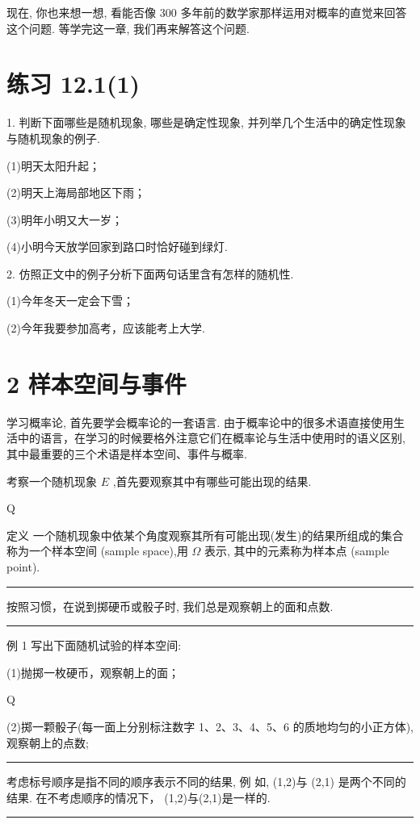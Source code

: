 \documentclass[10pt]{article}
\newcommand{\HRule}{\begin{center}\rule{0.9\linewidth}{0.2mm}\end{center}}
\begin{document}
现在, 你也来想一想, 看能否像 300 多年前的数学家那样运用对概率的直觉来回答这个问题. 等学完这一章, 我们再来解答这个问题.

\section*{练习 12.1(1)}

1. 判断下面哪些是随机现象, 哪些是确定性现象, 并列举几个生活中的确定性现象与随机现象的例子.

(1)明天太阳升起；

(2)明天上海局部地区下雨；

(3)明年小明又大一岁；

(4)小明今天放学回家到路口时恰好碰到绿灯.

2. 仿照正文中的例子分析下面两句话里含有怎样的随机性.

(1)今年冬天一定会下雪；

(2)今年我要参加高考，应该能考上大学.

\section*{2 样本空间与事件}

学习概率论, 首先要学会概率论的一套语言. 由于概率论中的很多术语直接使用生活中的语言，在学习的时候要格外注意它们在概率论与生活中使用时的语义区别, 其中最重要的三个术语是样本空间、事件与概率.

考察一个随机现象 \(E\) ,首先要观察其中有哪些可能出现的结果.

Q

定义 一个随机现象中依某个角度观察其所有可能出现(发生)的结果所组成的集合称为一个样本空间 (sample space),用 \(\Omega\) 表示, 其中的元素称为样本点 (sample point).

\HRule

按照习惯，在说到掷硬币或骰子时, 我们总是观察朝上的面和点数.

\HRule

例 1 写出下面随机试验的样本空间:

(1)抛掷一枚硬币，观察朝上的面；

Q

(2)掷一颗骰子(每一面上分别标注数字 1、2、3、4、5、6 的质地均匀的小正方体), 观察朝上的点数;

\HRule

考虑标号顺序是指不同的顺序表示不同的结果, 例 如, (1,2)与 (2,1) 是两个不同的结果. 在不考虑顺序的情况下， (1,2)与(2,1)是一样的.

\HRule
\end{document}

